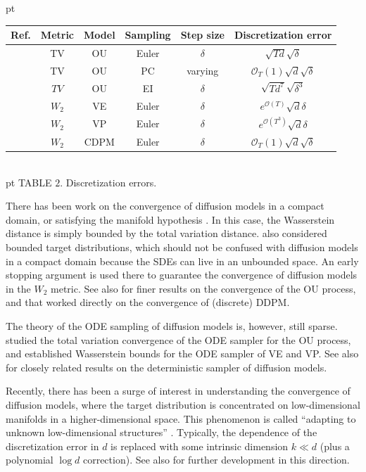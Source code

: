 \documentclass[letterpaper,11pt,reqno]{amsart}
\numberwithin{equation}{section}
\begin{document}
 pt

\begin{center}
    \begin{tabular}{| c | c | c | c| c| c|}
    \hline
     Ref. & Metric & Model & Sampling & Step size & Discretization error  \\ \hline
       \cite{Chen23} & TV  &  OU & Euler & $\delta$ & $\sqrt{T  d} \sqrt{\delta}$ \\ \hline
       \cite{LLT22, LLT23} & TV & OU & PC & varying & $\mathcal{O}_T(1) \sqrt{d} \sqrt{\delta}$ \\  \hline
       \cite{WCW24}& $TV $ & OU & EI & $\delta$ & $\sqrt{Td^7} \sqrt{\delta^3}$ \\ \hline
       \cite{GNZ23}& $W_2$ & VE & Euler & $\delta$ & $e^{\mathcal{O}(T)} \sqrt{d} \delta $ \\ \hline
       & $W_2$ & VP& Euler & $\delta$  & $e^{\mathcal{O}(T^3)} \sqrt{d} \delta$ \\ \hline
       \cite{TZ24} & $W_2$ & CDPM & Euler & $\delta$ &  $\mathcal{O}_T(1) \sqrt{d} \sqrt{\delta} $ \\ \hline
    \end{tabular}\\
     pt
    {TABLE $2$. Discretization errors.}
\end{center}

\quad There has been work 
on the convergence of diffusion models in a compact domain,
or satisfying the manifold hypothesis \cite{DeB22, pid22}.
In this case,
the Wasserstein distance is simply 
bounded by the total variation distance.
\cite{Chen23, LLT22, LLT23} also considered 
bounded target distributions,
which should not be confused with diffusion models in a compact domain
because the SDEs can live in an unbounded space.
An early stopping argument is used there to guarantee the convergence
of diffusion models in the $W_2$ metric.
See also \cite{Ben23a}
for finer results on the convergence of the OU process,
and \cite{LC24, LH24, LW23} that worked directly on the convergence of (discrete) DDPM.

\quad The theory of the ODE sampling of diffusion models is,
however,
still sparse.
\cite{Chen23b, HHL25} studied
the total variation convergence of the 
ODE sampler for the OU process,
and \cite{GZ24} 
established Wasserstein bounds 
for the ODE sampler of VE and VP.
See also \cite{Ben23b, Chen23c, LH24, LW23, LY24}
for closely related results 
on the deterministic sampler of diffusion models.

\quad Recently, there has been a surge of interest in understanding the convergence of diffusion models,
where the target distribution is concentrated on low-dimensional manifolds in a higher-dimensional space.
This phenomenon is called ``adapting to unknown low-dimensional structures'' \cite{LYl24}.
Typically, the dependence of the discretization error in $d$ 
is replaced with some intrinsic dimension $k \ll d$ (plus a polynomial $\log d$ correction).
See also \cite{HWC24, LHC25, PAD24, TY25} for further development in this direction.
\end{document}
